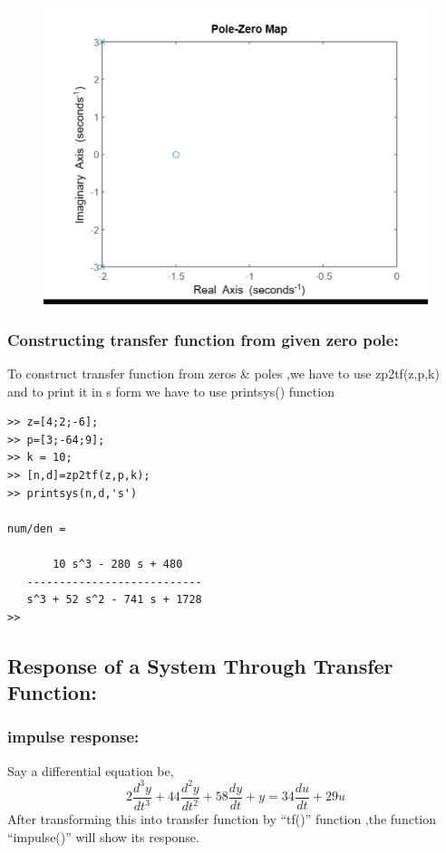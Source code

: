 \documentclass[conference]{IEEEtran}
\begin{document}
\begin{figure}[h!]
  \includegraphics[width=\linewidth]{fig1.png}
  \label{fig:fig1}
\end{figure}


\subsubsection{Constructing transfer function from given zero pole:}
To construct transfer function from zeros \& poles ,we have to use zp2tf(z,p,k) and to print it in s form we have to use printsys() function

\begin{verbatim}
>> z=[4;2;-6];
>> p=[3;-64;9];
>> k = 10;
>> [n,d]=zp2tf(z,p,k);
>> printsys(n,d,'s')
 
num/den = 
 
       10 s^3 - 280 s + 480
   ---------------------------
   s^3 + 52 s^2 - 741 s + 1728
>> 
\end{verbatim}




\subsection{Response of a System Through Transfer Function:}
\subsubsection{impulse response:}
Say a differential equation be, 
\[2\frac{d^3y}{dt^3} + 44\frac{d^2y}{dt^2} +58 \frac{dy}{dt} + y = 34\frac{du}{dt} +29u\]
After transforming this into transfer function by “tf()” function ,the function “impulse()” will show its response.
\end{document}
